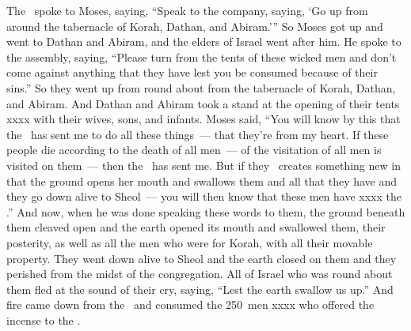 \begin{inparaenum}
   The \lord\ spoke to Moses, saying,%
   ``Speak to the company, saying, `Go up from around the tabernacle of Korah, Dathan, and Abiram.'\thinspace''%
   So Moses got up and went to Dathan and Abiram, and the elders of Israel went after him.%
   He spoke to the assembly, saying, ``Please turn from the tents of these wicked men and don't come against anything that they have lest you be consumed because of their sins.''%
   So they went up from round about from the tabernacle of Korah, Dathan, and Abiram. And Dathan and Abiram took a stand at the opening of their tents xxxx with their wives, sons, and infants.%
   Moses said, ``You will know by this that the \lord\ has sent me to do all these things~--- that they're from my heart.%
   If these people die according to the death of all men~--- of the visitation of all men is visited on them~--- then the \lord\ has sent me.%
   But if they \lord\ creates something new in that the ground opens her mouth and swallows them and all that they have and they go down alive to Sheol~--- you will then know that these men have xxxx the \lord.''%
   And now, when he was done speaking these words to them, the ground beneath them cleaved open\understood{}%
   and the earth opened its mouth and swallowed them, their posterity, as well as all the men who were for Korah, with all their movable property.%
   They went down alive to Sheol and the earth closed on them and they perished from the midst of the congregation.%
   All of Israel who was round about them fled at the sound of their cry, saying, ``Lest the earth swallow us up.''%
   And fire came down from the \lord\ and consumed the 250~men xxxx who offered the incense to the \lord.%
\end{inparaenum}
